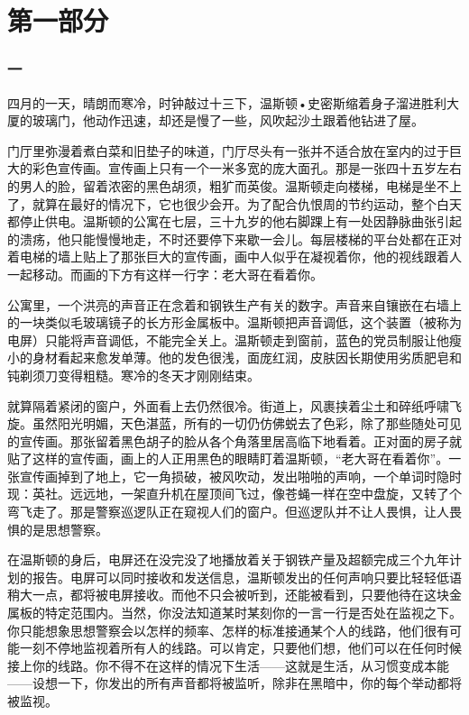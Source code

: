 \part*{第一部分}

\section*{一}\label{ux4e00}

四月的一天，晴朗而寒冷，时钟敲过十三下，温斯顿•史密斯缩着身子溜进胜利大厦的玻璃门，他动作迅速，却还是慢了一些，风吹起沙土跟着他钻进了屋。

门厅里弥漫着煮白菜和旧垫子的味道，门厅尽头有一张并不适合放在室内的过于巨大的彩色宣传画。宣传画上只有一个一米多宽的庞大面孔。那是一张四十五岁左右的男人的脸，留着浓密的黑色胡须，粗犷而英俊。温斯顿走向楼梯，电梯是坐不上了，就算在最好的情况下，它也很少会开。为了配合仇恨周的节约运动，整个白天都停止供电。温斯顿的公寓在七层，三十九岁的他右脚踝上有一处因静脉曲张引起的溃疡，他只能慢慢地走，不时还要停下来歇一会儿。每层楼梯的平台处都在正对着电梯的墙上贴上了那张巨大的宣传画，画中人似乎在凝视着你，他的视线跟着人一起移动。而画的下方有这样一行字：老大哥在看着你。

公寓里，一个洪亮的声音正在念着和钢铁生产有关的数字。声音来自镶嵌在右墙上的一块类似毛玻璃镜子的长方形金属板中。温斯顿把声音调低，这个装置（被称为电屏）只能将声音调低，不能完全关上。温斯顿走到窗前，蓝色的党员制服让他瘦小的身材看起来愈发单薄。他的发色很浅，面庞红润，皮肤因长期使用劣质肥皂和钝剃须刀变得粗糙。寒冷的冬天才刚刚结束。

就算隔着紧闭的窗户，外面看上去仍然很冷。街道上，风裹挟着尘土和碎纸呼啸飞旋。虽然阳光明媚，天色湛蓝，所有的一切仍仿佛蜕去了色彩，除了那些随处可见的宣传画。那张留着黑色胡子的脸从各个角落里居高临下地看着。正对面的房子就贴了这样的宣传画，画上的人正用黑色的眼睛盯着温斯顿，``老大哥在看着你''。一张宣传画掉到了地上，它一角损破，被风吹动，发出啪啪的声响，一个单词时隐时现：英社。远远地，一架直升机在屋顶间飞过，像苍蝇一样在空中盘旋，又转了个弯飞走了。那是警察巡逻队正在窥视人们的窗户。但巡逻队并不让人畏惧，让人畏惧的是思想警察。

在温斯顿的身后，电屏还在没完没了地播放着关于钢铁产量及超额完成三个九年计划的报告。电屏可以同时接收和发送信息，温斯顿发出的任何声响只要比轻轻低语稍大一点，都将被电屏接收。而他不只会被听到，还能被看到，只要他待在这块金属板的特定范围内。当然，你没法知道某时某刻你的一言一行是否处在监视之下。你只能想象思想警察会以怎样的频率、怎样的标准接通某个人的线路，他们很有可能一刻不停地监视着所有人的线路。可以肯定，只要他们想，他们可以在任何时候接上你的线路。你不得不在这样的情况下生活——这就是生活，从习惯变成本能——设想一下，你发出的所有声音都将被监听，除非在黑暗中，你的每个举动都将被监视。

